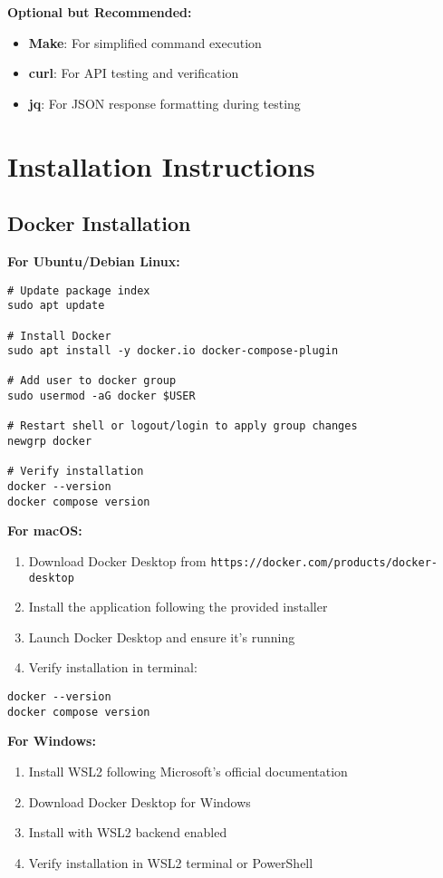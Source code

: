 \textbf{Optional but Recommended:}
\begin{itemize}
    \item \textbf{Make}: For simplified command execution
    \item \textbf{curl}: For API testing and verification
    \item \textbf{jq}: For JSON response formatting during testing
\end{itemize}

\section{Installation Instructions}

\subsection{Docker Installation}

\textbf{For Ubuntu/Debian Linux:}
\begin{verbatim}
# Update package index
sudo apt update

# Install Docker
sudo apt install -y docker.io docker-compose-plugin

# Add user to docker group
sudo usermod -aG docker $USER

# Restart shell or logout/login to apply group changes
newgrp docker

# Verify installation
docker --version
docker compose version
\end{verbatim}

\textbf{For macOS:}
\begin{enumerate}
    \item Download Docker Desktop from \texttt{https://docker.com/products/docker-desktop}
    \item Install the application following the provided installer
    \item Launch Docker Desktop and ensure it's running
    \item Verify installation in terminal:
\end{enumerate}
\begin{verbatim}
docker --version
docker compose version
\end{verbatim}

\textbf{For Windows:}
\begin{enumerate}
    \item Install WSL2 following Microsoft's official documentation
    \item Download Docker Desktop for Windows
    \item Install with WSL2 backend enabled
    \item Verify installation in WSL2 terminal or PowerShell
\end{enumerate}

